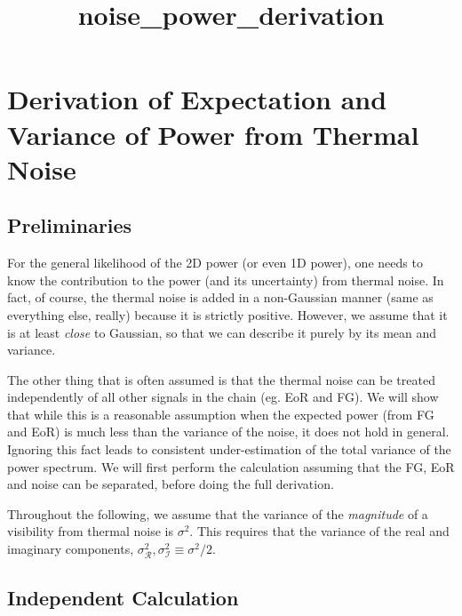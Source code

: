 \documentclass[11pt]{article}
\title{noise\_power\_derivation}
\begin{document}
    
    
    \maketitle
    
    

    
    \hypertarget{derivation-of-expectation-and-variance-of-power-from-thermal-noise}{%
\section{Derivation of Expectation and Variance of Power from Thermal
Noise}\label{derivation-of-expectation-and-variance-of-power-from-thermal-noise}}

    \hypertarget{preliminaries}{%
\subsection{Preliminaries}\label{preliminaries}}

    For the general likelihood of the 2D power (or even 1D power), one needs
to know the contribution to the power (and its uncertainty) from thermal
noise. In fact, of course, the thermal noise is added in a non-Gaussian
manner (same as everything else, really) because it is strictly
positive. However, we assume that it is at least \emph{close} to
Gaussian, so that we can describe it purely by its mean and variance.

    The other thing that is often assumed is that the thermal noise can be
treated independently of all other signals in the chain (eg. EoR and
FG). We will show that while this is a reasonable assumption when the
expected power (from FG and EoR) is much less than the variance of the
noise, it does not hold in general. Ignoring this fact leads to
consistent under-estimation of the total variance of the power spectrum.
We will first perform the calculation assuming that the FG, EoR and
noise can be separated, before doing the full derivation.

    Throughout the following, we assume that the variance of the
\emph{magnitude} of a visibility from thermal noise is \(\sigma^2\).
This requires that the variance of the real and imaginary components,
\(\sigma^2_\mathcal{R}, \sigma^2_\mathcal{I} \equiv \sigma^2 /2\).

    \hypertarget{independent-calculation}{%
\subsection{Independent Calculation}\label{independent-calculation}}
\end{document}
